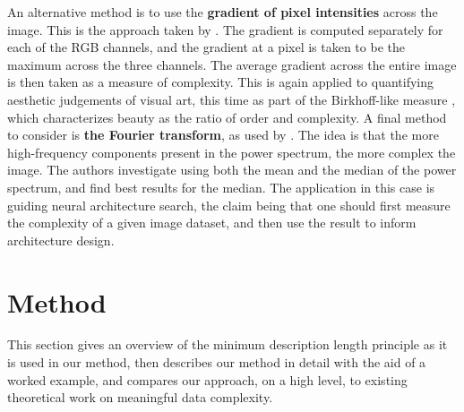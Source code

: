 \documentclass[a4paper,fleqn]{cas-sc}
\theoremstyle{remark}
\begin{document}
An alternative method is to use the \textbf{gradient of pixel intensities} across the image. This is the approach taken by \citet{redies2012phog}. The gradient is computed separately for each of the RGB channels, and the gradient at a pixel is taken to be the maximum across the three channels. The average gradient across the entire image is then taken as a measure of complexity. This is again applied to quantifying aesthetic judgements of visual art, this time as part of the Birkhoff-like measure \citep{birkhoff1933aesthetic}, which characterizes beauty as the ratio of order and complexity. 
A final method to consider is \textbf{the Fourier transform}, as used by \citet{khan2022leveraging}. The idea is that the more high-frequency components present in the power spectrum, the more complex the image. The authors investigate using both the mean and the median of the power spectrum, and find best results for the median.
The application in this case is guiding neural architecture search, the claim being that one should first measure the complexity of a given image dataset, and then use the result to inform architecture design.

\section{Method} \label{sec:method}
This section gives an overview of the minimum description length principle as it is used in our method, then describes our method in detail with the aid of a worked example, and compares our approach, on a high level, to existing theoretical work on meaningful data complexity.
\end{document}
